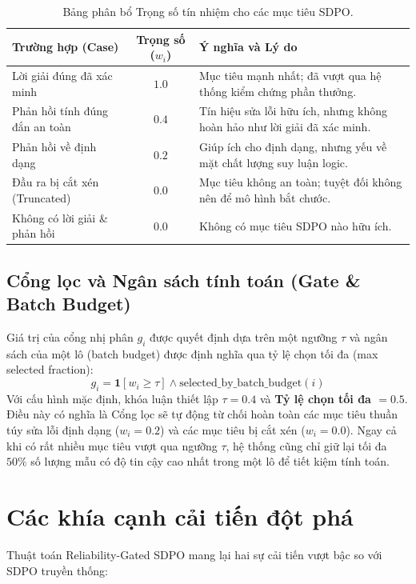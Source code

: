 \documentclass[12pt,a4paper]{report}
\begin{document}
\begin{table}[ht!]
    \centering
    \begin{tabular}{|l|c|p{7.5cm}|}
        \hline
        \textbf{Trường hợp (Case)} & \textbf{Trọng số ($w_i$)} & \textbf{Ý nghĩa và Lý do} \\
        \hline
        Lời giải đúng đã xác minh & $1.0$ & Mục tiêu mạnh nhất; đã vượt qua hệ thống kiểm chứng phần thưởng. \\
        \hline
        Phản hồi tính đúng đắn an toàn & $0.4$ & Tín hiệu sửa lỗi hữu ích, nhưng không hoàn hảo như lời giải đã xác minh. \\
        \hline
        Phản hồi về định dạng & $0.2$ & Giúp ích cho định dạng, nhưng yếu về mặt chất lượng suy luận logic. \\
        \hline
        Đầu ra bị cắt xén (Truncated) & $0.0$ & Mục tiêu không an toàn; tuyệt đối không nên để mô hình bắt chước. \\
        \hline
        Không có lời giải \& phản hồi & $0.0$ & Không có mục tiêu SDPO nào hữu ích. \\
        \hline
    \end{tabular}
    \caption{Bảng phân bổ Trọng số tín nhiệm cho các mục tiêu SDPO.}
    \label{tab:reliability_weights}
\end{table}

\subsection{Cổng lọc và Ngân sách tính toán (Gate \& Batch Budget)}
Giá trị của cổng nhị phân $g_i$ được quyết định dựa trên một ngưỡng $\tau$ và ngân sách của một lô (batch budget) được định nghĩa qua tỷ lệ chọn tối đa (max selected fraction):
\begin{equation}
    g_i = \mathbf{1}[w_i \geq \tau] \land \text{selected\_by\_batch\_budget}(i)
\end{equation}
Với cấu hình mặc định, khóa luận thiết lập \textbf{$\tau = 0.4$} và \textbf{Tỷ lệ chọn tối đa $= 0.5$}. Điều này có nghĩa là Cổng lọc sẽ tự động từ chối hoàn toàn các mục tiêu thuần túy sửa lỗi định dạng ($w_i = 0.2$) và các mục tiêu bị cắt xén ($w_i = 0.0$). Ngay cả khi có rất nhiều mục tiêu vượt qua ngưỡng $\tau$, hệ thống cũng chỉ giữ lại tối đa $50\%$ số lượng mẫu có độ tin cậy cao nhất trong một lô để tiết kiệm tính toán.

\section{Các khía cạnh cải tiến đột phá}
Thuật toán Reliability-Gated SDPO mang lại hai sự cải tiến vượt bậc so với SDPO truyền thống:
\end{document}
